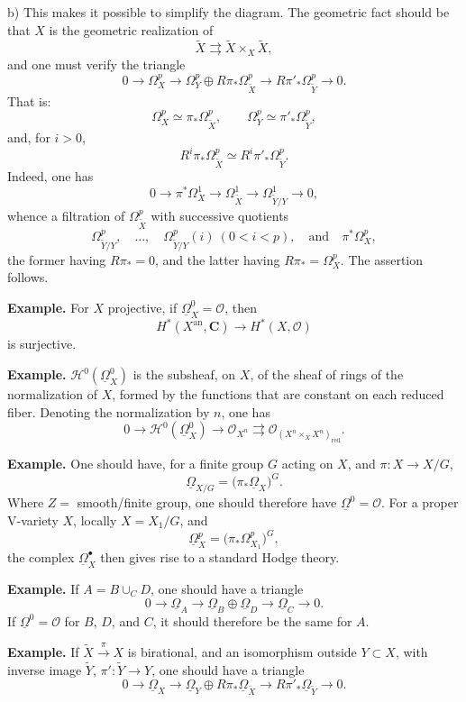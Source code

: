 \documentclass[11pt]{article}
\newcommand{\OO}{\mathcal O}
\newcommand{\CC}{\mathbf C}
\newcommand{\HH}{\mathcal H}
\newcommand{\uOmega}{\underline{\Omega}}
\newcommand{\red}{\mathrm{red}}
\begin{document}
b) This makes it possible to simplify the diagram. The geometric fact should be that \(X\) is the geometric realization of
\[
\widetilde X\rightrightarrows \widetilde X\times_X\widetilde X,
\]
and one must verify the triangle
\[
0\longrightarrow \Omega^p_X\longrightarrow
\Omega^p_Y\oplus R\pi_\ast\Omega^p_{\widetilde X}
\longrightarrow R\pi'_\ast\Omega^p_{\widetilde Y}\longrightarrow 0.
\]
That is:
\[
\Omega^p_X\simeq \pi_\ast\Omega^p_{\widetilde X},\qquad
\Omega^p_Y\simeq \pi'_\ast\Omega^p_{\widetilde Y},
\]
and, for \(i>0\),
\[
R^i\pi_\ast\Omega^p_{\widetilde X}\simeq
R^i\pi'_\ast\Omega^p_{\widetilde Y}.
\]
Indeed, one has
\[
0\longrightarrow \pi^\ast\Omega^1_X\longrightarrow
\Omega^1_{\widetilde X}\longrightarrow \Omega^1_{\widetilde Y/Y}\longrightarrow 0,
\]
whence a filtration of \(\Omega^p_{\widetilde X}\) with successive quotients
\[
\Omega^p_{\widetilde Y/Y},\quad \ldots,\quad
\Omega^p_{\widetilde Y/Y}(i)\ (0<i<p),\quad\text{and}\quad
\pi^\ast\Omega^p_X,
\]
the former having \(R\pi_\ast=0\), and the latter having \(R\pi_\ast=\Omega^p_X\). The assertion follows.

\textbf{Example.} For \(X\) projective, if \(\uOmega^0_X=\OO\), then
\[
H^\ast(X^{\mathrm{an}},\CC)\longrightarrow H^\ast(X,\OO)
\]
is surjective.

\textbf{Example.} \(\HH^0(\uOmega^0_X)\) is the subsheaf, on \(X\), of the sheaf of rings of the normalization of \(X\), formed by the functions that are constant on each reduced fiber. Denoting the normalization by \(n\), one has
\[
0\longrightarrow \HH^0(\uOmega^0_X)\longrightarrow
\OO_{X^n}\rightrightarrows
\OO_{(X^n\times_X X^n)_{\red}}.
\]

\textbf{Example.} One should have, for a finite group \(G\) acting on \(X\), and \(\pi\colon X\to X/G\),
\[
\uOmega_{X/G}=\bigl(\pi_\ast\uOmega_X\bigr)^G.
\]
Where \(Z=\) smooth/finite group, one should therefore have \(\uOmega^0=\OO\). For a proper V-variety \(X\), locally \(X=X_1/G\), and
\[
\uOmega^p_X=\bigl(\pi_\ast\Omega^p_{X_1}\bigr)^G,
\]
the complex \(\uOmega^\bullet_X\) then gives rise to a standard Hodge theory.

\textbf{Example.} If \(A=B\cup_C D\), one should have a triangle
\[
0\longrightarrow \uOmega_A\longrightarrow
\uOmega_B\oplus\uOmega_D\longrightarrow \uOmega_C\longrightarrow 0.
\]
If \(\uOmega^0=\OO\) for \(B\), \(D\), and \(C\), it should therefore be the same for \(A\).

\textbf{Example.} If \(\widetilde X\xrightarrow{\pi}X\) is birational, and an isomorphism outside \(Y\subset X\), with inverse image \(\widetilde Y\), \(\pi'\colon\widetilde Y\to Y\), one should have a triangle
\[
0\longrightarrow \uOmega_X\longrightarrow
\uOmega_Y\oplus R\pi_\ast\uOmega_{\widetilde X}
\longrightarrow R\pi'_\ast\uOmega_{\widetilde Y}\longrightarrow 0.
\]
\end{document}
